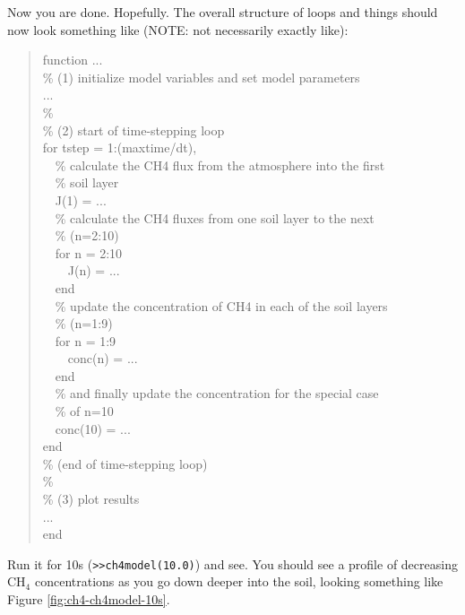 \documentclass{tufte-book} %
\newenvironment{docspec}{\begin{quotation}\ttfamily\parskip0pt\parindent0pt\ignorespaces}{\end{quotation}}
\begin{document}
Now you are done. Hopefully. The overall structure of loops and things should now look something like (NOTE: not necessarily exactly like):

\begin{docspec}
function ...
\\ \% (1) initialize model variables and set model parameters
\\ ...
\\ \%
\\ \% (2) start of time-stepping loop
\\for tstep = 1:(maxtime/dt),
\\ \ \ \% calculate the CH4 flux from the atmosphere into the first
\\ \ \  \% soil layer
\\ \ \ J(1) = ...
\\ \ \ \% calculate the CH4 fluxes from one soil layer to the next
\\ \ \ \% (n=2:10)    
\\ \ \ for n = 2:10
\\ \ \ \ \ J(n) = ...
\\ \ \ end
\\ \ \ \% update the concentration of CH4 in each of the soil layers
\\ \ \  \% (n=1:9)
\\ \ \ for n = 1:9
\\ \ \ \ \ conc(n) = ...
\\ \ \ end
\\ \ \ \% and finally update the concentration for the special case
\\ \ \ \% of n=10
\\ \ \ conc(10) = ...
\\end
\\ \% (end of time-stepping loop)
\\ \% 
\\ \% (3) plot results
\\...
\\end
\end{docspec}

Run it for 10s (\texttt{>>ch4model(10.0)}) and see. You should see a profile of decreasing CH\(_{4}\) concentrations as you go down deeper into the soil, looking something like Figure \ref{fig:ch4-ch4model-10s}.
\end{document}
